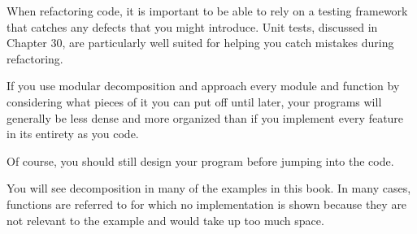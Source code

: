 When refactoring code, it is important to be able to rely on a testing framework that catches any defects that you might introduce. Unit tests, discussed in Chapter 30, are particularly well suited for helping you catch mistakes during refactoring.


If you use modular decomposition and approach every module and function by considering what pieces of it you can put off until later, your programs will generally be less dense and more organized than if you implement every feature in its entirety as you code.

Of course, you should still design your program before jumping into the code.


You will see decomposition in many of the examples in this book. In many cases, functions are referred to for which no implementation is shown because they are not relevant to the example and would take up too much space.